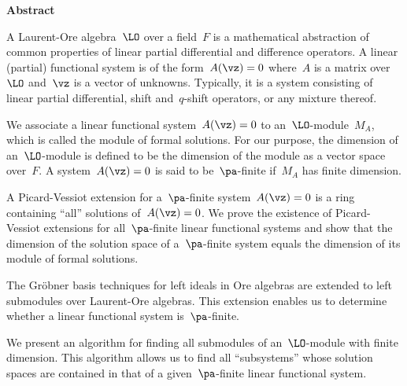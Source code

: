 

\centerline{{\bf Abstract}}
\bigskip \noindent



A Laurent-Ore algebra~$\LO$ over a field~$F$ is a mathematical
abstraction of common properties of linear partial differential
and difference operators. A linear (partial) functional system is
of the form~$A(\vz)=0$ where~$A$ is a matrix over~$\LO$ and~$\vz$
is a vector of unknowns. Typically, it is a system consisting of
linear partial differential, shift and~$q$-shift operators, or any
mixture thereof.



We associate a linear functional system~$A(\vz)=0$ to
an~$\LO$-module~$M_A$, which is called the module of formal
solutions. For our purpose, the %
dimension of an~$\LO$-module is  defined to be the dimension of
the module as a vector space over~$F$. A system~$A(\vz)=0$ is said
to be~$\pa$-finite if~$M_A$ has finite dimension.


A Picard-Vessiot extension for a~$\pa$-finite system~$A(\vz)=0$ is
a ring containing ``all'' solutions of~$A(\vz)=0$. We prove the
existence of Picard-Vessiot extensions for all~$\pa$-finite linear
functional systems and show that the dimension of the solution
space of a~$\pa$-finite system equals the dimension of its module
of formal solutions.

The Gr\"obner basis techniques for left ideals in Ore algebras are
extended to left submodules over Laurent-Ore algebras.  This
extension enables us to determine whether a linear functional
system is~$\pa$-finite.

We present an algorithm for finding all submodules of
an~$\LO$-module with finite dimension. This algorithm allows us to
find all ``subsystems'' whose solution spaces are contained in
that of a given~$\pa$-finite linear functional system.



